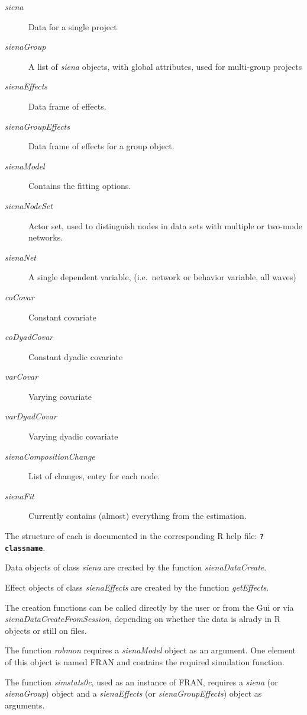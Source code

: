 \documentclass[12pt,a4paper]{article}
\renewcommand{\=}{\,=\,}
\newcommand{\+}{\,+\,}
\newcommand{\nm}[1]{\textsf{\small #1}}
\newcommand{\nnm}[1]{\textsf{\small\textit{#1}}}
\newcommand{\sfn}[1]{\textbf{\texttt{#1}}}
\newcommand{\R}{{\sf R }}
\begin{document}
\begin{description}
\item[\nnm{siena}] Data for a single project
\item[\nnm{sienaGroup}] A list of \nnm{siena} objects, with global attributes,
  used for multi-group projects
\item[\nnm{sienaEffects}] Data frame of effects.
\item[\nnm{sienaGroupEffects}] Data frame of effects for a group object.
\item[\nnm{sienaModel}] Contains the fitting options.
\item[\nnm{sienaNodeSet}] Actor set, used to distinguish nodes in data sets with
  multiple or two-mode networks.
\item[\nnm{sienaNet}] A single dependent variable, (i.e.\ network or behavior
  variable, all waves)
\item[\nnm{coCovar}] Constant covariate
\item[\nnm{coDyadCovar}] Constant dyadic covariate
\item[\nnm{varCovar}] Varying covariate
\item[\nnm{varDyadCovar}] Varying dyadic covariate
\item[\nnm{sienaCompositionChange}] List of changes, entry for each node.
\item[\nnm{sienaFit}] Currently contains (almost) everything from the
  estimation.
\end{description}

The structure of each is documented in the corresponding \R help file:
\sfn{?classname}.

Data objects of class \nnm{siena} are created by the function
\nnm{sienaDataCreate}.

Effect objects of class \nnm{sienaEffects} are created by the function
\nnm{getEffects}.

The creation functions can be called directly by the user or from the Gui or via
\nnm{sienaDataCreateFromSession}, depending on whether the data is alrady in \R
objects or still on files.

The function \nnm{robmon} requires a \nnm{sienaModel} object
as an argument. One element of this object is named \nm{FRAN} and contains the
required simulation function.

The function \nnm{simstats0c}, used as an instance of \nm{FRAN}, requires a
\nnm{siena} (or \nnm{sienaGroup}) object and a \nnm{sienaEffects} (or
\nnm{sienaGroupEffects}) object as arguments.
\end{document}
